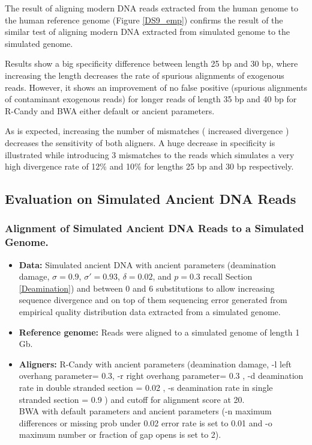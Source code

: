 \documentclass[11pt,a4paper]{report}
\begin{document}
The result of aligning modern DNA reads extracted from the human genome
to the human reference genome (Figure \ref{DS9_emp}) confirms the result 
of the similar test of aligning modern DNA extracted from simulated genome 
to the simulated genome.  

 
Results show a big specificity difference between length 25 bp and 30 bp, 
where increasing the length decreases the rate of spurious alignments of
exogenous reads. However, it shows an improvement of no false positive (spurious
alignments of contaminant exogenous reads) for longer reads of length 35 bp and 
40 bp for R-Candy and BWA either default or ancient parameters. 

As is expected, increasing the number of mismatches ( increased divergence ) 
decreases the sensitivity of both aligners. A huge decrease in specificity is
illustrated while introducing 3 mismatches to the reads which simulates a very
high divergence rate of 12\% and 10\% for lengths 25 bp and 30 bp respectively.




\subsection{Evaluation on Simulated Ancient DNA Reads}

\subsubsection{Alignment of Simulated Ancient DNA Reads to a Simulated Genome.}
\label{ Alignment of Simulated Ancient DNA Reads to a Simulated Genome.}

\begin{itemize}
 
   
    \item \textbf{Data:} Simulated ancient DNA 
     with ancient parameters (deamination damage, $ \sigma = 0.9$, 
    $ \sigma' = 0.93 $, $\delta = 0.02 $,  and $p = 0.3 $ \cite{mapdamage2} 
    recall Section \ref{Deamination})
    and between 0 and 6 substitutions to allow increasing sequence divergence
    and on top of them sequencing error generated from empirical quality 
    distribution data extracted from a simulated genome.
  
 
   \item \textbf{Reference genome:}  Reads were aligned to a simulated genome of 
   length 1 Gb.


  \item \textbf{Aligners:} R-Candy with ancient parameters 
  (deamination damage, -l left overhang parameter= 0.3,
   -r right overhang parameter= 0.3 , 
   -d deamination rate in double stranded section = 0.02 , 
   -s deamination rate in single stranded section = 0.9 )
   and cutoff for alignment score at 20. \\
   BWA with default parameters and ancient parameters
   (-n maximum differences or missing prob under 0.02 error rate is set to 0.01 
   and -o maximum number or fraction of gap opens is set to 2)\cite{green2010draft}.

  \end{itemize}
\end{document}
